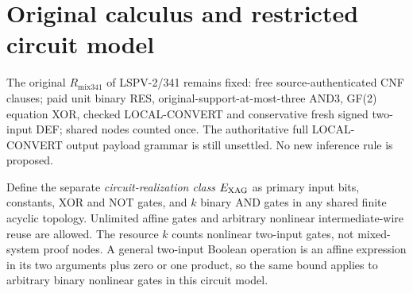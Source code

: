 \documentclass[11pt]{article}
\begin{document}
\section*{Original calculus and restricted circuit model}
The original $R_{\mathrm{mix341}}$ of LSPV-2/341 remains fixed: free source-authenticated CNF clauses; paid unit binary RES, original-support-at-most-three AND3, GF(2) equation XOR, checked LOCAL-CONVERT and conservative fresh signed two-input DEF; shared nodes counted once. The authoritative full LOCAL-CONVERT output payload grammar is still unsettled. No new inference rule is proposed.
\par Define the separate \emph{circuit-realization class} $E_{\rm XAG}$ as primary input bits, constants, XOR and NOT gates, and $k$ binary AND gates in any shared finite acyclic topology. Unlimited affine gates and arbitrary nonlinear intermediate-wire reuse are allowed. The resource $k$ counts nonlinear two-input gates, not mixed-system proof nodes. A general two-input Boolean operation is an affine expression in its two arguments plus zero or one product, so the same bound applies to arbitrary binary nonlinear gates in this circuit model.
\end{document}
